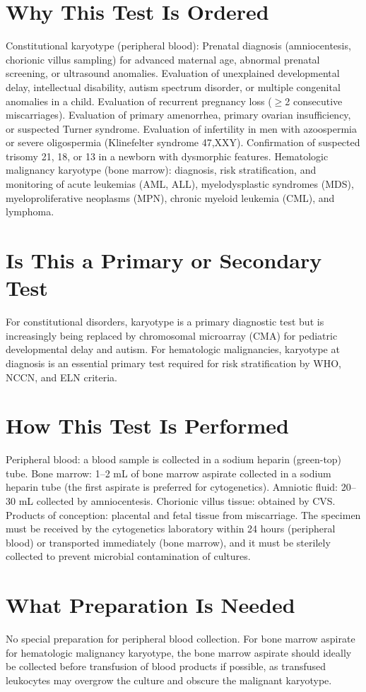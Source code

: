 \section*{Why This Test Is Ordered}
Constitutional karyotype (peripheral blood): Prenatal diagnosis (amniocentesis, chorionic villus sampling) for advanced maternal age, abnormal prenatal screening, or ultrasound anomalies. Evaluation of unexplained developmental delay, intellectual disability, autism spectrum disorder, or multiple congenital anomalies in a child. Evaluation of recurrent pregnancy loss ($\geq$2 consecutive miscarriages). Evaluation of primary amenorrhea, primary ovarian insufficiency, or suspected Turner syndrome. Evaluation of infertility in men with azoospermia or severe oligospermia (Klinefelter syndrome 47,XXY). Confirmation of suspected trisomy 21, 18, or 13 in a newborn with dysmorphic features. Hematologic malignancy karyotype (bone marrow): diagnosis, risk stratification, and monitoring of acute leukemias (AML, ALL), myelodysplastic syndromes (MDS), myeloproliferative neoplasms (MPN), chronic myeloid leukemia (CML), and lymphoma.

\section*{Is This a Primary or Secondary Test}
For constitutional disorders, karyotype is a primary diagnostic test but is increasingly being replaced by chromosomal microarray (CMA) for pediatric developmental delay and autism. For hematologic malignancies, karyotype at diagnosis is an essential primary test required for risk stratification by WHO, NCCN, and ELN criteria.

\section*{How This Test Is Performed}
Peripheral blood: a blood sample is collected in a sodium heparin (green-top) tube. Bone marrow: 1--2 mL of bone marrow aspirate collected in a sodium heparin tube (the first aspirate is preferred for cytogenetics). Amniotic fluid: 20--30 mL collected by amniocentesis. Chorionic villus tissue: obtained by CVS. Products of conception: placental and fetal tissue from miscarriage. The specimen must be received by the cytogenetics laboratory within 24 hours (peripheral blood) or transported immediately (bone marrow), and it must be sterilely collected to prevent microbial contamination of cultures.

\section*{What Preparation Is Needed}
No special preparation for peripheral blood collection. For bone marrow aspirate for hematologic malignancy karyotype, the bone marrow aspirate should ideally be collected before transfusion of blood products if possible, as transfused leukocytes may overgrow the culture and obscure the malignant karyotype.

